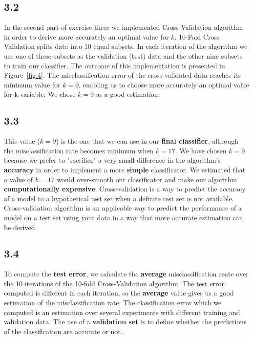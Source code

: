 \documentclass[letterpaper,11pt]{article}
\begin{document}
\subsection*{3.2}
In the second part of exercise three we implemented Cross-Validation algorithm in order to derive more accurately an optimal value for $k$. 10-Fold Cross Validation splits data into $10$ equal subsets. In each iteration of the algorithm we use one of these subsets as the validation (test) data and the other nine subsets to train our classifier. The outcome of this implementation is presented in Figure~\ref{fig:4}. The misclassification error of the cross-validated data reaches its minimum value for $k=9$, enabling us to choose more accurately an optimal value for k variable. We chose $k=9$ as a good estimation. 


\subsection*{3.3}
This value ($k=9$) is the one that we can use in our \textbf{final classifier}, although the misclassification rate becomes minimum when $k=17$. We have chosen $k=9$ because we prefer to "sacrifice" a very small difference in the algorithm's \textbf{accuracy} in order to implement a more \textbf{simple} classificator. We estimated that a value of $k=17$ would over-smooth our classificator and make our algorithm \textbf{computationally expensive}. Cross-validation is a way to predict the accuracy of a model to a hypothetical test set when a definite test set is not available. Cross-validation algorithm is an applicable way to predict the performance of a model on a test set using your data in a way that more accurate estimation can be derived. 

\subsection*{3.4}
To compute the \textbf{test error}, we calculate the \textbf{average} misclassification reate over the 10 iterations of the 10-fold Cross-Validation algorithm. The test error computed is different in each iteration, so the \textbf{average} value gives us a good estimation of the misclassification rate. The classification error which we computed is an estimation over several experiments with different training and validation data. The use of a \textbf{validation set} is to define whether the predictions of the classification are accurate or not.
\end{document}
